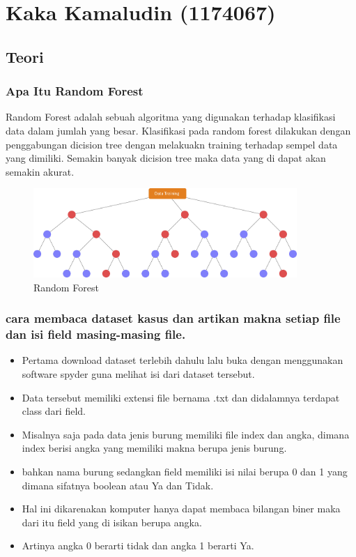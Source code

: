 \section{Kaka Kamaludin (1174067)}
\subsection{Teori}

\subsubsection{Apa Itu Random Forest}

\hfill\break
Random Forest adalah sebuah algoritma yang digunakan terhadap klasifikasi data dalam jumlah yang besar. Klasifikasi pada random forest dilakukan dengan penggabungan dicision tree dengan melakuakn training terhadap sempel data yang dimiliki. Semakin banyak dicision tree maka data yang di dapat akan
semakin akurat.
\begin{figure}[H]
\centerline{\includegraphics[width=10cm]{figures/1174067/3/1.jpg}}
\caption{Random Forest}
\label{labelgambar}
\end{figure}

\subsubsection{cara membaca dataset kasus dan artikan makna setiap file dan isi field masing-masing file.}

\hfill\break
\begin{itemize}
\item Pertama download dataset terlebih dahulu lalu buka dengan menggunakan software spyder guna melihat isi dari dataset tersebut.

\item Data tersebut memiliki extensi file bernama .txt dan didalamnya terdapat class dari field.

\item Misalnya saja pada data jenis burung memiliki file index dan angka, dimana index berisi angka yang memiliki makna berupa jenis burung.

\item bahkan nama burung sedangkan field memiliki isi nilai berupa 0 dan 1 yang dimana sifatnya boolean atau Ya dan Tidak.

\item Hal ini dikarenakan komputer hanya dapat membaca bilangan biner maka dari itu field yang di isikan berupa angka.

\item Artinya angka 0 berarti tidak dan angka 1 berarti Ya.
\end{itemize}

